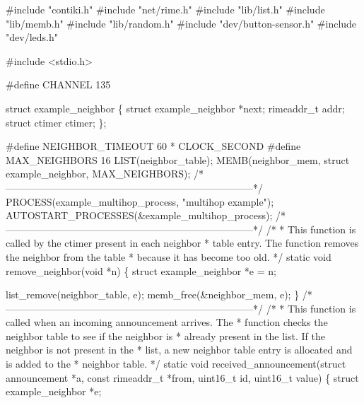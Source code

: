 \begin{DoxyCodeInclude}
\textcolor{preprocessor}{#include "contiki.h"}
\textcolor{preprocessor}{#include "net/rime.h"}
\textcolor{preprocessor}{#include "lib/list.h"}
\textcolor{preprocessor}{#include "lib/memb.h"}
\textcolor{preprocessor}{#include "lib/random.h"}
\textcolor{preprocessor}{#include "dev/button-sensor.h"}
\textcolor{preprocessor}{#include "dev/leds.h"}

\textcolor{preprocessor}{#include <stdio.h>}

\textcolor{preprocessor}{#define CHANNEL 135}


\textcolor{keyword}{struct }example\_neighbor \{
  \textcolor{keyword}{struct }example\_neighbor *next;
  rimeaddr\_t addr;
  \textcolor{keyword}{struct }ctimer ctimer;
\};

\textcolor{preprocessor}{#define NEIGHBOR\_TIMEOUT 60 * CLOCK\_SECOND}
\textcolor{preprocessor}{#define MAX\_NEIGHBORS 16}
LIST(neighbor\_table);
MEMB(neighbor\_mem, \textcolor{keyword}{struct} example\_neighbor, MAX\_NEIGHBORS);
\textcolor{comment}{/*---------------------------------------------------------------------------*/}
PROCESS(example\_multihop\_process, \textcolor{stringliteral}{"multihop example"});
AUTOSTART\_PROCESSES(&example\_multihop\_process);
\textcolor{comment}{/*---------------------------------------------------------------------------*/}
\textcolor{comment}{/*}
\textcolor{comment}{ * This function is called by the ctimer present in each neighbor}
\textcolor{comment}{ * table entry. The function removes the neighbor from the table}
\textcolor{comment}{ * because it has become too old.}
\textcolor{comment}{ */}
\textcolor{keyword}{static} \textcolor{keywordtype}{void}
remove\_neighbor(\textcolor{keywordtype}{void} *n)
\{
  \textcolor{keyword}{struct }example\_neighbor *e = n;

  list\_remove(neighbor\_table, e);
  memb\_free(&neighbor\_mem, e);
\}
\textcolor{comment}{/*---------------------------------------------------------------------------*/}
\textcolor{comment}{/*}
\textcolor{comment}{ * This function is called when an incoming announcement arrives. The}
\textcolor{comment}{ * function checks the neighbor table to see if the neighbor is}
\textcolor{comment}{ * already present in the list. If the neighbor is not present in the}
\textcolor{comment}{ * list, a new neighbor table entry is allocated and is added to the}
\textcolor{comment}{ * neighbor table.}
\textcolor{comment}{ */}
\textcolor{keyword}{static} \textcolor{keywordtype}{void}
received\_announcement(\textcolor{keyword}{struct} announcement *a,
                      \textcolor{keyword}{const} rimeaddr\_t *from,
                      uint16\_t \textcolor{keywordtype}{id}, uint16\_t value)
\{
  \textcolor{keyword}{struct }example\_neighbor *e;


\end{DoxyCodeInclude}
